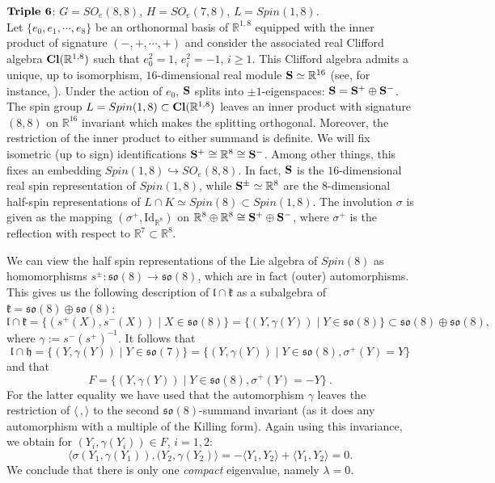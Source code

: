 \documentclass[10]{amsart}
\theoremstyle{remark}
\theoremstyle{definition}
\numberwithin{equation}{section}
\newcommand{\R}{\mathbb{R}}           %
\newcommand{\fh}{{\mathfrak h}}
\newcommand{\fk}{{\mathfrak k}}
\newcommand{\fl}{{\mathfrak l}}
\newcommand{\fo}{{\mathfrak{so}}}
\newcommand{\IP}[2]{\langle#1\,, #2\rangle}     %
\begin{document}
{\underline{$\text{\bf Triple 6}$}: $G=SO_{e}(8,8)$, $H=SO_{e}(7,8)$, $L=Spin(1,8)$.\\ 
Let $\{e_0,e_1,\cdots,e_8\}$ be an orthonormal basis of ${\mathbb R}^{1,8}$ equipped with the inner product of signature $(-,+,\cdots,+)$ and consider the associated 
real Clifford algebra ${\bf Cl}({\mathbb R}^{1,8})$ such that $e_0^2=1$, $e_i^2=-1$, $i\ge 1$. This Clifford algebra admits a unique, up to isomorphism, $16$-dimensional real module ${\bf S}\simeq{\mathbb R}^{16}$ (see, for instance, \cite{De99}). Under the action of $e_0$, ${\bf S}$ splits into $\pm 1$-eigenspaces: ${\bf S}={\bf S}^+\oplus {\bf S}^-$. The spin group $L=Spin(1,8)\subset{\bf Cl}({\mathbb R}^{1,8})$ leaves an inner product with signature $(8,8)$ on ${\mathbb R}^{16}$ invariant which makes the splitting orthogonal.
Moreover, the restriction of the inner product to either summand is definite. We will fix isometric (up to sign) identifications ${\bf S}^+\cong\R^8\cong {\bf S}^-$. Among other things, this fixes an embedding $Spin(1,8)\hookrightarrow SO_e(8,8)$. In fact, ${\bf S}$ is the $16$-dimensional real spin representation of $Spin(1,8)$, while ${\bf S}^\pm \simeq{\mathbb R}^8$ are the $8$-dimensional half-spin representations of $L\cap K\simeq Spin(8)\subset Spin(1,8)$. 
The involution $\sigma$ is given as the mapping $(\sigma^+,\text{Id}_{\R^8})$ on $\R^8\oplus\R^8\cong {\bf S}^+\oplus {\bf S}^-$, where $\sigma^+$ is the reflection with respect to $\R^7\subset \R^8$. 

We can view the half spin representations of the Lie algebra of $Spin(8)$ as  homomorphisms $s^\pm:\fo(8)\rightarrow\fo(8)$, which are in fact (outer) automorphisms. This
gives us the following description of $\fl\cap\fk$ as a subalgebra of $\fk=\fo(8)\oplus\fo(8)$:
$$ \fl\cap \fk =\{(s^+(X),s^-(X))\mid X\in\fo(8)\}=\{(Y,\gamma(Y))\mid Y\in\fo(8)\}\subset\fo(8)\oplus\fo(8), $$
where $\gamma:=s^-(s^+)^{-1}$. It follows that
$$ \fl\cap\fh=\{(Y,\gamma(Y))\mid Y\in\fo(7)\}=\{(Y,\gamma(Y))\mid Y\in\fo(8),\sigma^+(Y)=Y\}$$
and that 
$$ F= \{(Y,\gamma(Y))\mid Y\in\fo(8),\sigma^+(Y)=-Y\}\ .$$
For the latter equality we have used that the automorphism $\gamma$ leaves the restriction of $\IP{}{}$ to the second $\fo(8)$-summand invariant (as it does any automorphism with a multiple of the Killing form). Again using this invariance, we obtain for $(Y_i,\gamma(Y_i))\in F$, $i=1,2$:
$$ \langle \sigma(Y_1,\gamma(Y_1)),(Y_2,\gamma(Y_2)\rangle=-\langle Y_1,Y_2\rangle + \langle Y_1,Y_2\rangle= 0.$$
We conclude that there is only one {\it compact} eigenvalue, namely $\lambda=0$.

}
\end{document}
